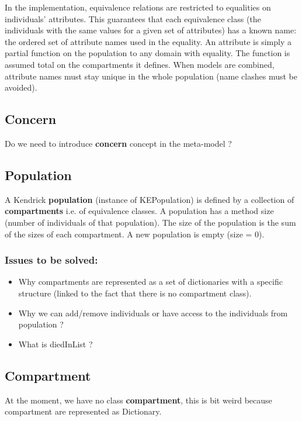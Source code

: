\documentclass[11pt]{article}
\begin{document}
In the implementation, equivalence relations are restricted to equalities on individuals' attributes.
This guarantees that each equivalence class (the individuals with the same values for a given set of attributes) has a known name: the ordered set of attribute names used in the equality.
An attribute is simply a partial function on the population to any domain with equality. The function is assumed total on the compartments it defines.
When models are combined, attribute names must stay unique in the whole population (name clashes must be avoided).

\subsection{Concern}
\label{sec:org45f2a76}
Do we need to introduce \textbf{concern} concept in the meta-model ?

\subsection{Population}
\label{sec:org24a2b2c}
A Kendrick \textbf{population} (instance of KEPopulation) is defined by a collection of \textbf{compartments} i.e. of equivalence classes.
A population has a method size (number of individuals of that population).
The size of the population is the sum of the sizes of each compartment.
A new population is empty (size = 0).

\subsubsection{Issues to be solved:}
\label{sec:org38a2a9f}
\begin{itemize}
\item Why compartments are represented as a set of dictionaries with a specific structure (linked to the fact that there is no compartment class).
\item Why we can add/remove individuals or have access to the individuals from population ?
\item What is diedInList ?
\end{itemize}

\subsection{Compartment}
\label{sec:org637f939}
At the moment, we have no class \textbf{compartment}, this is bit weird because compartment are represented as Dictionary.
\end{document}
